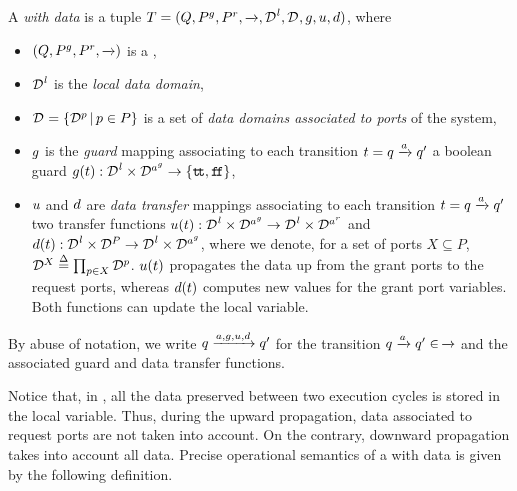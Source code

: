 \begin{definition}
  \label{defn:data}
  A \emph{\compmodel{} with data} is a tuple $T=(Q, \pin, \pout, \goesto{},
  \local{\data}, \data, \guard, \up, \down)$, where
  \begin{itemize}
  \item $(Q, \pin, \pout, \goesto{})$ is a \compmodel{},
  \item $\local{\data}$ is the \emph{local data domain},
  \item $\data = \setdef{\data[p]}{p \in P}$ is a set of \emph{data domains
    associated to ports} of the system,
  \item $\guard$ is the \emph{guard} mapping associating to each transition
    $t = q \goesto{a} q'$ a boolean guard $\guard(t): \local{\data} \times
    \data[\grant{a}] \rightarrow \{\true,\false\}$,
  \item $\up$ and $\down$ are \emph{data transfer} mappings associating to
    each transition $t = q \goesto{a} q'$ two transfer functions $\up(t):
    \local{\data} \times \data[\grant{a}] \rightarrow \local{\data} \times
    \data[\request{a}]$ and $\down(t): \local{\data} \times \data[P]
    \rightarrow \local{\data} \times \data[\grant{a}]$, where we denote,
    for a set of ports $X \subseteq P$, $\data[X] \bydef{=} \prod_{p \in X}
    \data[p]$.  $\up(t)$ propagates the data up from the grant ports to the
    request ports, whereas $\down(t)$ computes new values for the grant
    port variables.  Both functions can update the local variable.
  \end{itemize}

  By abuse of notation, we write $q \goesto{a,\guard,\up,\down} q'$ for
  the transition $q \goesto{a} q' \in\, \goesto{}$ and the associated guard
  and data transfer functions.
\end{definition}

Notice that, in , all the data preserved between two execution
cycles is stored in the local variable.  Thus, during the upward
propagation, data associated to request ports are not taken into account.
On the contrary, downward propagation takes into account all data.  Precise
operational semantics of a \compmodel{} with data is given by the following
definition.

